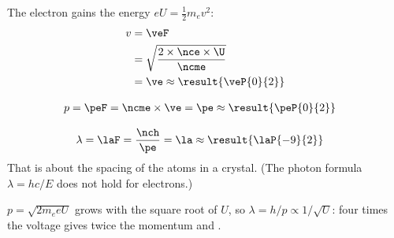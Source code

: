 \begin{abcliste}
\abc The electron gains the energy $e U = \frac{1}{2} m_e v^2$:
\begin{align}
 v &= \veF \\
   &= \sqrt{\frac{2\times\nce\times\U}{\ncme}} \\
   &= \ve \approx \result{\veP{0}{2}}
\end{align}

\abc
\begin{align}
 p &= \peF = \ncme\times\ve = \pe \approx \result{\peP{0}{2}}
\end{align}

\abc
\begin{align}
 \lambda &= \laF = \frac{\nch}{\pe} = \la \approx \result{\laP{-9}{2}}
\end{align}
That is about the spacing of the atoms in a crystal. (The photon formula $\lambda = hc/E$ does not hold for electrons.)

\abc $p = \sqrt{2 m_e e U}$ grows with the square root of $U$, so $\lambda = h/p \propto 1/\sqrt{U}$: four times the voltage gives twice the momentum and .
\end{abcliste}
